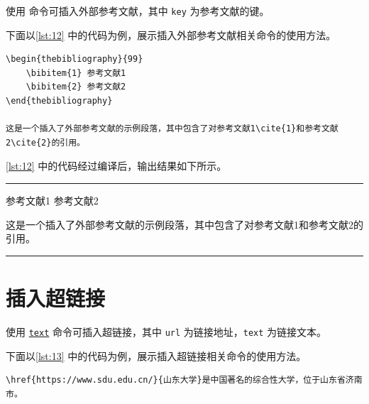 \documentclass[a4paper]{article}
\begin{document}
使用 \texttt{\cite{key}} 命令可插入外部参考文献，其中 \texttt{key} 为参考文献的键。

下面以\cref{lst:12} 中的代码为例，展示插入外部参考文献相关命令的使用方法。

\begin{center}
    \label{lst:12}
    \begin{verbatim}
\begin{thebibliography}{99}
    \bibitem{1} 参考文献1
    \bibitem{2} 参考文献2
\end{thebibliography}

这是一个插入了外部参考文献的示例段落，其中包含了对参考文献1\cite{1}和参考文献2\cite{2}的引用。
    \end{verbatim}
\end{center}

\cref{lst:12} 中的代码经过编译后，输出结果如下所示。

\vspace{0.75cm}
\hrule
\vspace{0.25cm}

\begin{thebibliography}{99}
     参考文献1
     参考文献2
\end{thebibliography}

这是一个插入了外部参考文献的示例段落，其中包含了对参考文献1\cite{1}和参考文献2\cite{2}的引用。

\vspace{0.25cm}
\hrule
\vspace{0.25cm}

\section{插入超链接}

使用 \texttt{\href{url}{text}} 命令可插入超链接，其中 \texttt{url} 为链接地址，\texttt{text} 为链接文本。

下面以\cref{lst:13} 中的代码为例，展示插入超链接相关命令的使用方法。

\begin{center}
    \label{lst:13}
    \begin{verbatim}
\href{https://www.sdu.edu.cn/}{山东大学}是中国著名的综合性大学，位于山东省济南市。
    \end{verbatim}
\end{center}
\end{document}

